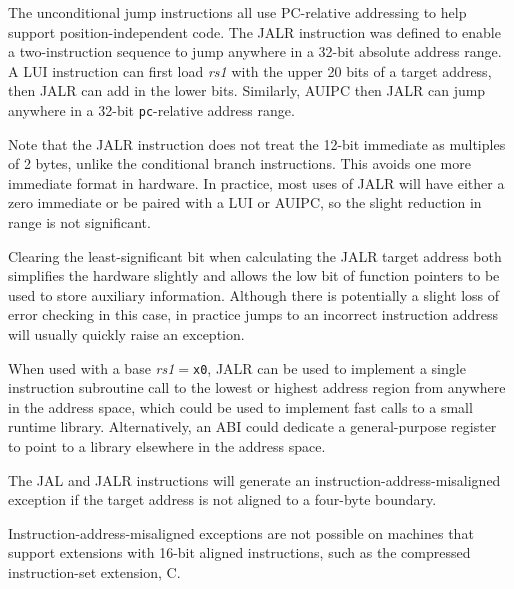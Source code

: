 \begin{commentary}
The unconditional jump instructions all use PC-relative addressing to
help support position-independent code.  The JALR instruction was
defined to enable a two-instruction sequence to jump anywhere in a
32-bit absolute address range.  A LUI instruction can first load {\em
  rs1} with the upper 20 bits of a target address, then JALR can add
in the lower bits. Similarly, AUIPC then JALR can jump
anywhere in a 32-bit {\tt pc}-relative address range.

Note that the JALR instruction does not treat the 12-bit immediate as
multiples of 2 bytes, unlike the conditional branch instructions.
This avoids one more immediate format in hardware.  In
practice, most uses of JALR will have either a zero immediate or be
paired with a LUI or AUIPC, so the slight reduction in range is not
significant.

Clearing the least-significant bit when calculating the JALR target
address both simplifies the hardware slightly and allows the
low bit of function pointers to be used to store auxiliary
information.  Although there is potentially a slight loss of error
checking in this case, in practice jumps to an incorrect instruction
address will usually quickly raise an exception.

When used with a base {\em rs1}$=${\tt x0}, JALR can be used to implement
a single instruction subroutine call to the lowest  or highest
 address region from anywhere in the address space, which could
be used to implement fast calls to a small runtime library.  Alternatively,
an ABI could dedicate a general-purpose register to point to a library
elsewhere in the address space.
\end{commentary}

The JAL and JALR instructions will generate an
instruction-address-misaligned exception if the target address is not
aligned to a four-byte boundary.

\begin{commentary}
Instruction-address-misaligned exceptions are not possible on machines
that support extensions with 16-bit aligned instructions, such as the
compressed instruction-set extension, C.
\end{commentary}

